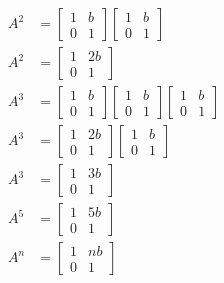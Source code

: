\documentclass[main.tex]{subfiles}
\begin{document}
\begin{enumerate}
    $$
    \begin{aligned}
    A^{2} &=\left[\begin{array}{ll}
    1 & b \\
    0 & 1
    \end{array}\right]\left[\begin{array}{ll}
    1 & b \\
    0 & 1
    \end{array}\right] \\
    A^{2} &=\left[\begin{array}{cc}
    1 & 2 b \\
    0 & 1
    \end{array}\right]\\
    A^{3} &=\left[\begin{array}{ll}
    1 & b \\
    0 & 1
    \end{array}\right]\left[\begin{array}{ll}
    1 & b \\
    0 & 1
    \end{array}\right]\left[\begin{array}{ll}
    1 & b \\
    0 & 1
    \end{array}\right] \\
    A^{3} &=\left[\begin{array}{cc}
    1 & 2 b \\
    0 & 1
    \end{array}\right]\left[\begin{array}{ll}
    1 & b \\
    0 & 1
    \end{array}\right] \\
    A^{3} &=\left[\begin{array}{cc}
    1 & 3 b \\
    0 & 1
    \end{array}\right]\\
    A^{5} & =\left[\begin{array}{cc}
    1 & 5 b \\
    0 & 1
    \end{array}\right]\\
    A^{n} & =\left[\begin{array}{cc}
    1 & n b \\
    0 & 1
    \end{array}\right]
    \end{aligned}
    $$
    

\end{enumerate}
\end{document}
